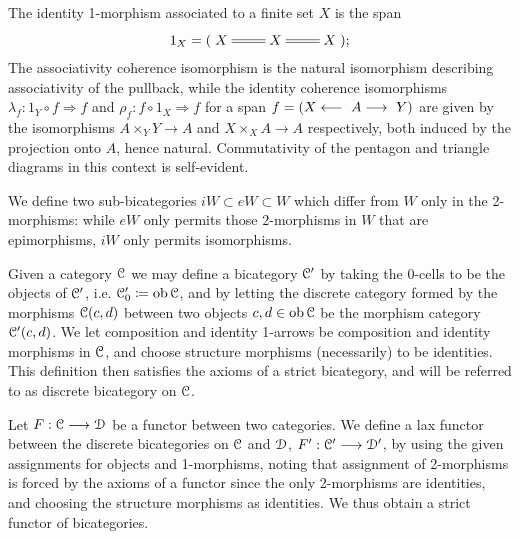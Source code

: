 \begin{defn}
    The identity 1-morphism associated to a finite set $X$ is the span %
    \begin{displaymath}
      1_X = (\xymatrix{ X & X \ar@{=}[l] \ar@{=}[r] & X});
    \end{displaymath}
    The associativity coherence isomorphism is the natural isomorphism describing associativity of the pullback, while the identity coherence isomorphisms $\lambda_f: 1_Y \circ f \Longrightarrow f$ and $\rho_f: f \circ 1_X \Longrightarrow f$ for a span $f=(X\longleftarrow~A\longrightarrow~Y)$ are given by the isomorphisms $A \times_Y Y \to A$ and $X \times_X A \to A$ respectively, both induced by the projection onto $A$, hence natural. Commutativity of the pentagon and triangle diagrams in this context is self-evident.
  \end{defn}

  \begin{defn}\label{def_subcategories_of_epimorphisms_and_isomorphisms}
    We define two sub-bicategories $iW \subset eW \subset W$ which differ from $W$ only in the 2-morphisms: while $eW$ only permits those 2-morphisms in $W$ that are epimorphisms, $iW$ only permits isomorphisms.
  \end{defn}


  \begin{rem}\label{rem_discrete_bicategory}
    Given a category $\mathcal{C}$ we may define a bicategory $\mathcal{C}^\prime$ by taking the 0-cells to be the objects of $\mathcal{C}^\prime$, i.e. $\mathcal{C}^\prime_0 \coloneqq \operatorname{ob} \mathcal{C}$, and by letting the discrete category formed by the morphisms $\mathcal{C}(c,d)$ between two objects $c,d \in \operatorname{ob} \mathcal{C}$ be the morphism category $\mathcal{C}^\prime(c,d)$. We let composition and identity 1-arrows be composition and identity morphisms in $\mathcal{C}$, and choose structure morphisms (necessarily) to be identities. This definition then satisfies the axioms of a strict bicategory, and will be referred to as discrete bicategory on $\mathcal{C}$.
  \end{rem}

  \begin{rem}\label{rem_discrete_bicategories_functors}
    Let $F: \mathcal{C} \longrightarrow \mathcal{D}$ be a functor between two categories. We define a lax functor between the discrete bicategories on $\mathcal{C}$ and $\mathcal{D}$, $F^\prime: \mathcal{C}^\prime \longrightarrow \mathcal{D}^\prime$, by using the given assignments for objects and 1-morphisms, noting that assignment of 2-morphisms is forced by the axioms of a functor since the only 2-morphisms are identities, and choosing the structure morphisms as identities. We thus obtain a strict functor of bicategories.
  \end{rem}

